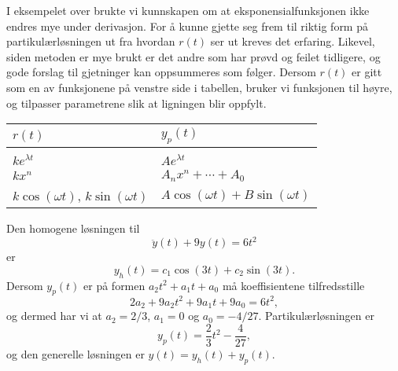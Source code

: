 \documentclass{article}
\theoremstyle{definition}
\newenvironment{ex}
{\pushQED{\qed}\renewcommand{\qedsymbol}{$\triangle$}\exx}
{\popQED\endexx}
\theoremstyle{remark}
\begin{document}
\begin{multicols*}{2}
I eksempelet over brukte vi kunnskapen om at eksponensialfunksjonen ikke endres mye under derivasjon. For å kunne gjette seg frem til riktig form på partikulærløsningen ut fra hvordan $r(t)$ ser ut kreves det erfaring. Likevel, siden metoden er mye brukt er det andre som har prøvd og feilet tidligere, og gode forslag til gjetninger kan oppsummeres som følger. Dersom $r(t)$ er gitt som en av funksjonene på venstre side i tabellen, bruker vi funksjonen til høyre, og tilpasser parametrene slik at ligningen blir oppfylt.

\begin{center}
  \begin{tabular}{m{} | m{}}
    $r(t)$ & $y_p(t)$ \\
    \hline \\
    $ke^{\lambda t}$ & $A e^{\lambda t}$ \\
    $k x^{n}$ & $A_n x^n + \cdots + A_0$ \\
    $k \cos(\omega t)$, $k \sin(\omega t)$ & \noindent\parbox[b]{\hsize}{$A \cos(\omega t) + B\sin(\omega t)$} \\
    $k e^{\lambda t} \cos(\omega t)$, $k e^{\lambda t} \sin(\omega t)$ & $e^{\lambda t} (A \cos(\omega t) + B\sin(\omega t))$ \\
  \end{tabular}
\end{center}

\begin{ex}
  Den homogene løsningen til
  \begin{equation*}
    \ddot{y}(t) + 9 y(t) = 6t^2
  \end{equation*}
  er
  \begin{equation*}
    y_h(t) = c_1 \cos(3t) + c_2 \sin(3t).
  \end{equation*}
  Dersom $y_p(t)$ er på formen $a_2 t^2 + a_1 t + a_0$ må koeffisientene tilfredsstille
  \begin{equation*}
    2a_2 + 9a_2 t^2 + 9a_1 t + 9 a_0 = 6 t^2,
  \end{equation*}
  og dermed har vi at $a_2 = 2/3$, $a_1 = 0$ og $a_0 = - 4/27$. Partikulærløsningen er
  \begin{equation*}
    y_p(t) = \frac{2}{3} t^2 - \frac{4}{27},
  \end{equation*}
  og den generelle løsningen er $y(t) = y_h(t) + y_p(t)$.
\end{ex}


\end{multicols*}
\end{document}
